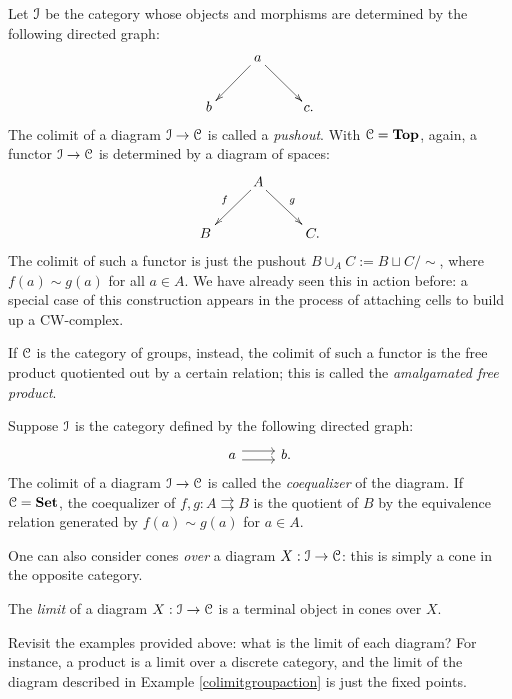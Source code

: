 \begin{example}
    Let $\mathcal I$ be the category whose objects and morphisms are determined by the following directed graph:
    \begin{equation*}
	\xymatrix{ & a\ar[dl]\ar[dr] & \\
	b & & c.}
    \end{equation*}
    The colimit of a diagram $\mathcal I\to \mathcal C$ is called a \emph{pushout}.
With  $\mathcal C=\mathbf{Top}$, again, a functor $\mathcal I\to \mathcal C$ is determined by a diagram of spaces:
    \begin{equation*}
	\xymatrix{
	    & A\ar[dl]_f\ar[dr]^g & \\
	    B & & C.
	    }
    \end{equation*}
    The colimit of such a functor is just the pushout $B\cup_A C:= B\sqcup C/\sim$, where $f(a)\sim g(a)$ for all $a\in A$.
    We have already seen this in action before: a special case of this construction appears in the process of attaching cells to build up a CW-complex.

    If $\mathcal C$ is the category of groups, instead, the colimit of such a functor is the free product quotiented out
    by a certain relation; this is called the \emph{amalgamated free product}.
\end{example}
\begin{example}
    Suppose $\mathcal I$ is the category defined by the following directed graph:
\begin{equation*}
    \begin{tikzcd}
	a\ar[r,shift left=.75ex]\ar[r,shift right=.75ex] & b.
    \end{tikzcd}
\end{equation*}
    The colimit of a diagram $\mathcal I\to\mathcal C$ is called the \emph{coequalizer} of the diagram. If $\mathcal C=\mathbf{Set}$, the coequalizer of $f,g:A\rightrightarrows B$ is the 
quotient of $B$ by the equivalence relation generated by $f(a)\sim g(a)$ for
$a\in A$.
\end{example}

    One can also consider cones \emph{over} a diagram $X:\mathcal I\to\mathcal C$: this is simply a cone in the opposite category.
\begin{definition}
The \emph{limit} of a diagram $X:\mathcal I\to\mathcal C$ is a terminal object in cones over $X$.
\end{definition}

\begin{exercise}
    Revisit the examples provided above: what is the limit of each diagram?
For instance, a product is a limit over a discrete category, 
and the limit of the diagram described in Example \ref{colimitgroupaction} is just the fixed points.
\end{exercise}

